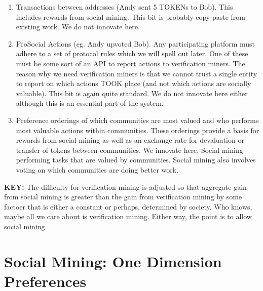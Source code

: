 \begin{enumerate}
	\item Transactions between addresses (Andy sent 5 TOKENs to Bob). This includes rewards from social mining. This bit is probably copy-paste from existing work. We do not innovate here.
	
	\item ProSocial Actions (eg. Andy upvoted Bob). Any participating platform must adhere to a set of protocol rules which we will spell out later. One of these must be some sort of an API to report actions to verification miners. The reason why we need verification miners is that we cannot trust a single entity to report on which actions TOOK place (and not which actions are socially valuable). This bit is again quite standard. We do not innovate here either although this is an essential part of the system.
	
	\item Preference orderings of which communities are most valued and who performs most valuable actions within communities. These orderings provide a basis for rewards from social mining as well as an exchange rate for devaluation or transfer of tokens between communities. We innovate here. Social mining performing tasks that are valued by communities. Social mining also involves voting on which communities are doing better work. 
	
\end{enumerate}

\textbf{KEY:} The difficulty for verification mining is adjusted so that aggregate gain from social mining is greater than the gain from verification mining by some factoer that is either a constant or perhaps, determined by society. Who knows, maybe all we care about is verification mining. Either way, the point is to allow social mining.

\section*{Social Mining: One Dimension Preferences}


